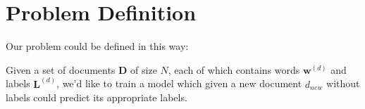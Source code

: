 \section{Problem Definition}
\label{sec:problem}

\noindent
Our problem could be defined in this way:

Given a set of documents $\boldsymbol{D}$ of size $N$, each of which contains words $\boldsymbol{w}^{(d)}$ and labels $\boldsymbol{L}^{(d)}$,  we'd like to train a model which given a new document $d_{new}$ without labels could predict its appropriate labels.